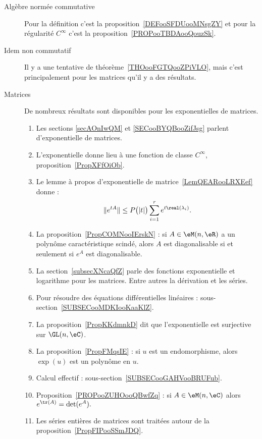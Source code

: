 \begin{description}
    \item[Algèbre normée commutative]

        Pour la définition c'est la proposition~\ref{DEFooSFDUooMNsgZY} et pour la régularité \(  C^{\infty}\) c'est la proposition~\ref{PROPooTBDAooQouzSk}.

    \item[Idem non commutatif]

        Il y a une tentative de théorème~\ref{THOooFGTQooZPiVLO}, mais c'est principalement pour les matrices qu'il y a des résultats.

    \item[Matrices]

        De nombreux résultats sont disponibles pour les exponentielles de matrices.

\begin{enumerate}
    \item
        Les sections \ref{secAOnIwQM} et \ref{SECooBYQBooZifJsg} parlent d'exponentielle de matrices.
    \item
        L'exponentielle donne lieu à une fonction de classe \(  C^{\infty}\), proposition~\ref{PropXFfOiOb}.
    \item
            Le lemme à propos d'exponentielle de matrice~\ref{LemQEARooLRXEef} donne :
            \begin{equation*}
                \|  e^{tA} \|\leq P\big( | t | \big)\sum_{i=1}^r e^{t\real(\lambda_i)}.
            \end{equation*}
        \item
            La proposition~\ref{PropCOMNooIErskN} : si \( A\in \eM(n,\eR)\) a un polynôme caractéristique scindé, alors \( A\) est diagonalisable si et seulement si \( e^A\) est diagonalisable.
\item
    La section~\ref{subsecXNcaQfZ} parle des fonctions exponentielle et logarithme pour les matrices. Entre autres la dérivation et les séries.
\item
    Pour résoudre des équations différentielles linéaires : sous-section~\ref{SUBSECooMDKIooKaaKlZ}.
\item
    La proposition~\ref{PropKKdmnkD} dit que l'exponentielle est surjective sur \( \GL(n,\eC)\).
\item

La proposition~\ref{PropFMqsIE} : si \( u\) est un endomorphisme, alors \( \exp(u)\) est un polynôme en \( u\).
\item
    Calcul effectif : sous-section~\ref{SUBSECooGAHVooBRUFub}.
\item Proposition~\ref{PROPooZUHOooQBwfZq} : si \( A\in\eM(n,\eC)\) alors $ e^{\tr(A)}=\det( e^{A}).$
    \item
        Les séries entières de matrices sont traitées autour de la proposition~\ref{PropFIPooSSmJDQ}.
\end{enumerate}


\end{description}

